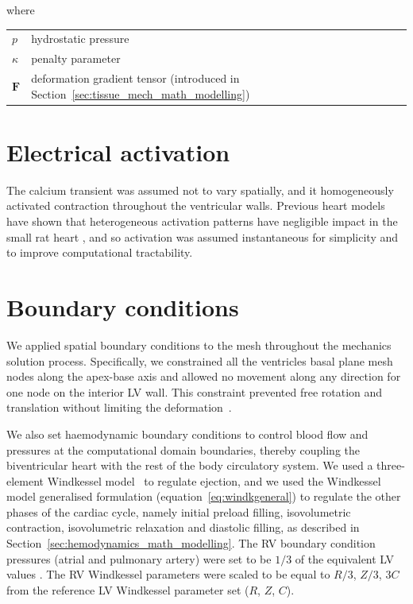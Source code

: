 \noindent
where

\vspace{0.2cm}
\begin{tabular}{ll}
    $p$ & hydrostatic pressure \\
    $\kappa$ & penalty parameter \\
    $\mathbf{F}$ & deformation gradient tensor (introduced in Section~\ref{sec:tissue_mech_math_modelling})
\end{tabular}


%
%
%
\section{Electrical activation}\label{sec:ch2electricalactivation}
The calcium transient was assumed not to vary spatially, and it homogeneously activated contraction throughout the ventricular walls. Previous heart models
have shown that heterogeneous activation patterns have negligible impact in the small rat heart , and so activation was assumed instantaneous for simplicity and to improve computational tractability.


%
%
%
\section{Boundary conditions}\label{sec:ch2boundaryconditions}
We applied spatial boundary conditions to the mesh throughout the mechanics solution process. Specifically, we constrained all the ventricles basal plane mesh nodes along the apex-base axis and allowed no movement along any direction for one node on the interior LV wall. This constraint prevented free rotation and translation without limiting the deformation~\cite{Land:2012}.

\vspace{0.2cm}
We also set haemodynamic boundary conditions to control blood flow and pressures at the computational domain boundaries, thereby coupling the biventricular heart with the rest of the body circulatory system. We used a three-element Windkessel model~\cite{Westerhof:1971} to regulate ejection, and we used the Windkessel model generalised formulation (equation~\eqref{eq:windkgeneral}) to regulate the other phases of the cardiac cycle, namely initial preload filling, isovolumetric contraction, isovolumetric relaxation and diastolic filling, as described in Section~\ref{sec:hemodynamics_math_modelling}. The RV boundary condition pressures (atrial and pulmonary artery) were set to be $1/3$ of the equivalent LV values . The RV Windkessel parameters were scaled to be equal to $R/3$, $Z/3$, $3C$ from the reference LV Windkessel parameter set ($R$, $Z$, $C$).


